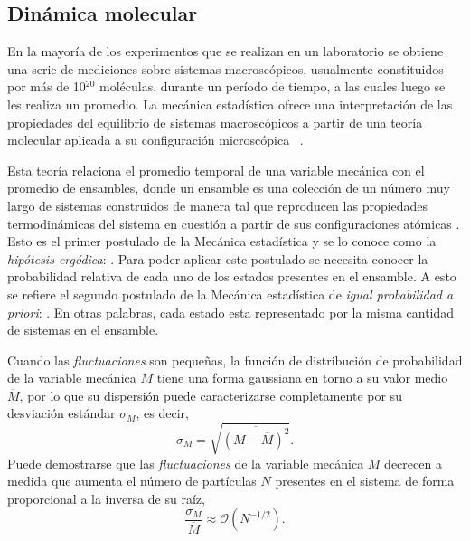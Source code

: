 \subsection{Dinámica molecular}

En la mayoría de los experimentos que se realizan en un laboratorio se obtiene 
una serie de mediciones sobre sistemas macroscópicos, usualmente constituidos por 
más de 10$^{20}$ moléculas, durante un período de tiempo, a las cuales luego se 
les realiza un promedio. La mecánica estadística ofrece una interpretación de 
las propiedades del equilibrio de sistemas macroscópicos a partir de una teoría 
molecular aplicada a su configuración microscópica ~\cite{hill1986}.

Esta teoría relaciona el promedio temporal de una variable mecánica con el 
promedio de ensambles, donde un ensamble es una colección de un número muy largo
de sistemas construidos de manera tal que reproducen las propiedades 
termodinámicas del sistema en cuestión a partir de sus configuraciones atómicas
\cite{salinas2001}. Esto es el primer postulado de la Mecánica estadística y se 
lo conoce como la \textit{hipótesis ergódica}: . Para poder aplicar
este postulado se necesita conocer la probabilidad relativa de cada uno de los 
estados presentes en el ensamble. A esto se refiere el segundo postulado de la 
Mecánica estadística de \textit{igual probabilidad a priori}: . En otras palabras, cada 
estado esta representado por la misma cantidad de sistemas en el ensamble.

Cuando las \textit{fluctuaciones} son pequeñas, la función de distribución de 
probabilidad de la variable mecánica $M$ tiene una forma gaussiana en torno a su 
valor medio $\overline{M}$, por lo que su dispersión puede caracterizarse 
completamente por su desviación estándar $\sigma_M$, es decir,
\begin{equation}
    \sigma_M = \sqrt{\overline{(M - \overline{M})^2}}.
\end{equation}
Puede demostrarse que las \textit{fluctuaciones} de la variable mecánica $M$ 
decrecen a medida que aumenta el número de partículas $N$ presentes en el sistema 
de forma proporcional a la inversa de su raíz,
\begin{equation}\label{eq:fluctuaciones}
    \frac{\sigma_M}{\overline{M}} \approx \mathcal{O}(N^{-1/2}).
\end{equation}

